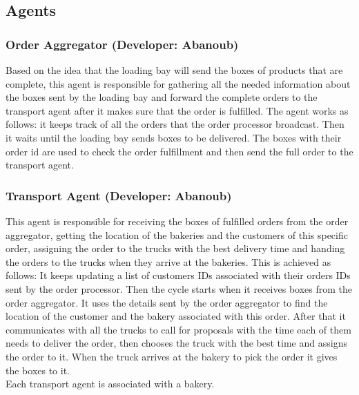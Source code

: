 \documentclass[11pt, a4paper]{article}
\begin{document}
\subsection{Agents}\label{DeliveryAgents}
\subsubsection{Order Aggregator (Developer: Abanoub)}
Based on the idea that the loading bay will send the boxes of products that are complete, this agent is responsible for gathering all the needed information about the boxes sent by the loading bay and forward the complete orders to the transport agent after it makes sure that the order is fulfilled. The agent works as follows: it keeps track of all the orders that the order processor broadcast. Then it waits until the loading bay sends boxes to be delivered. The boxes with their order id are used to check the order fulfillment and then send the full order to the transport agent.

\subsubsection{Transport Agent (Developer: Abanoub)}
This agent is responsible for receiving the boxes of fulfilled orders from the order aggregator, getting the location of the bakeries and the customers of this specific order, assigning the order to the trucks with the best delivery time and handing the orders to the trucks when they arrive at the bakeries. This is achieved as follows: It keeps updating a list of customers IDs associated with their orders IDs sent by the order processor. Then the cycle starts when it receives boxes from the order aggregator. It uses the details sent by the order aggregator to find the location of the customer and the bakery associated with this order. After that it communicates with all the trucks to call for proposals with the time each of them needs to deliver the order, then chooses the truck with the best time and assigns the order to it. When the truck arrives at the bakery to pick the order it gives the boxes to it.\\
Each transport agent is associated with a bakery.
\end{document}
